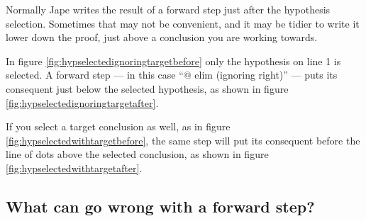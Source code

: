 \documentclass[11pt]{book}
\newcommand{\figref}[1]{figure \ref{fig:#1}}
\begin{document}
Normally Jape writes the result of a forward step just after 
the hypothesis selection. Sometimes that may not be convenient, 
and it may be tidier to write it lower down the proof, just above 
a conclusion you are working towards.

In \figref{hypselectedignoringtargetbefore} only the hypothesis on line 1 is selected. A forward step --- in this case ``$@$ elim (ignoring right)'' --- puts its consequent just below the selected hypothesis, as shown in \figref{hypselectedignoringtargetafter}.

If you select a target conclusion as well, as in \figref{hypselectedwithtargetbefore}, the same step will put its consequent before the line of dots above the selected conclusion, as shown in \figref{hypselectedwithtargetafter}.

\subsection{What can go wrong with a forward step?}
\end{document}
